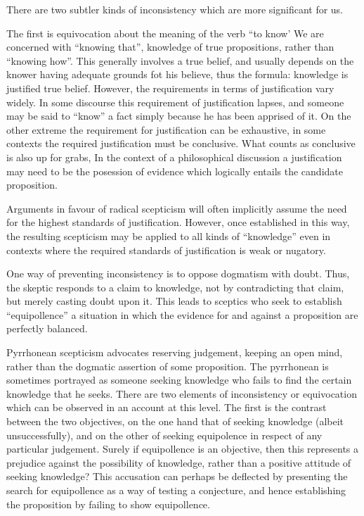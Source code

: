 There are two subtler kinds of inconsistency which are more significant for us.

The first is equivocation about the meaning of the verb ``to know'
We are concerned with ``knowing that'', knowledge of true propositions, rather than ``knowing how''.
This generally involves a true belief, and usually depends on the knower having adequate grounds fot his believe, thus the formula: knowledge is justified true belief.
However, the requirements in terms of justification vary widely.
In some discourse this requirement of justification lapses, and someone may be said to ``know'' a fact simply because he has been apprised of it.
On the other extreme the requirement for justification can be exhaustive, in some contexts the required justification must be conclusive.
What counts as conclusive is also up for grabs,
In the context of a philosophical discussion a justification may need to be the posession of evidence which logically entails the candidate proposition.

Arguments in favour of radical scepticism will often implicitly assume the need for the highest standards of justification.
However, once established in this way, the resulting scepticism may be applied to all kinds of ``knowledge'' even in contexts where the required standards of justification is weak or nugatory.

One way of preventing inconsistency is to oppose dogmatism with doubt.
Thus, the skeptic responds to a claim to knowledge, not by contradicting that claim, but merely casting doubt upon it.
This leads to sceptics who seek to establish ``equipollence'' a situation in which the evidence for and against a proposition are perfectly balanced.

Pyrrhonean scepticism advocates reserving judgement, keeping an open mind, rather than the dogmatic assertion of some proposition.
The pyrrhonean is sometimes portrayed as someone seeking knowledge who fails to find the certain knowledge that he seeks.
There are two elements of inconsistency or equivocation which can be observed in an account at this level.
The first is the contrast between the two objectives, on the one hand that of seeking knowledge (albeit unsuccessfully), and on the other of seeking equipolence in respect of any particular judgement.
Surely if equipollence is an objective, then this represents a prejudice against the possibility of knowledge, rather than a positive attitude of seeking knowledge?
This accusation can perhaps be deflected by presenting the search for equipollence as a way of testing a conjecture, and hence establishing the proposition by failing to show equipollence.


